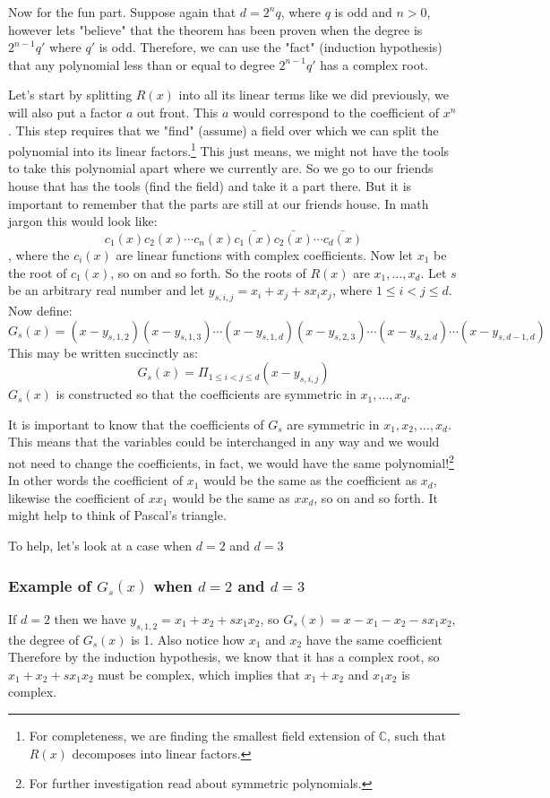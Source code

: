 \documentclass[12pt]{article}
\begin{document}
Now for the fun part.  Suppose again that $d=2^n q$, where $q$ is odd and $n>0$, however lets "believe" that the theorem has been proven when the degree is $2^{n-1}q'$ where $q'$ is odd.  Therefore, we can use the "fact" (induction hypothesis) that any polynomial less than or equal to degree $2^{n-1} q'$ has a complex root.

Let's start by splitting $R(x)$ into all its linear terms like we did previously, we will also put a factor $a$ out front.  This $a$ would correspond to the coefficient of $x^n$.  This step requires that we "find" (assume) a field over which we can split the polynomial into its linear factors.\footnote{For completeness, we are finding the smallest field extension of $\mathbb{C}$, such that $R(x)$ decomposes into linear factors.}  This just means, we might not have the tools to take this polynomial apart where we currently are.  So we go to our friends house that has the tools (find the field) and take it a part there.  But it is important to remember that the parts are still at our friends house.  In math jargon this would look like: \\
$$c_1(x)c_2(x)\cdots c_n(x)\bar{c_1(x)}\bar{c_2(x)}\cdots \bar{c_d(x)}$$, where the $c_i(x)$ are linear functions with complex coefficients.  Now let $x_1$ be the root of $c_1(x)$, so on and so forth.  So the roots of $R(x)$ are $x_1, \ldots, x_d$.  Let $s$ be an arbitrary real number and let $y_{s,i,j} = x_i +x_j + s x_i x_j$, where $1 \leq i < j \leq d$. Now define:
$$ G_s(x) =(x-y_{s,1,2})(x-y_{s,1,3})\cdots(x-y_{s,1,d})(x-y_{s,2,3})\cdots (x-y_{s,2,d})\cdots (x-y_{s,d-1,d})$$
This may be written succinctly as:
$$ G_s(x) = \Pi_{1 \leq i < j \leq d} (x-y_{s,i,j})$$
$G_s(x)$ is constructed so that the coefficients are symmetric in $x_1, \ldots
, x_d$.

It is important to know that the coefficients of $G_s$ are symmetric in $x_1, x_2, \ldots, x_d$.  This means that the variables could be interchanged in any way and we would not need to change the coefficients, in fact, we would have the same polynomial!\footnote{For further investigation read about symmetric polynomials.}  In other words the coefficient of $x_1$ would be the same as the coefficient as $x_d$, likewise the coefficient of $x x_1$ would be the same as $x x_d$, so on and so forth.  It might help to think of Pascal's triangle.

To help, let's look at a case when $d=2$ and $d=3$
\subsubsection*{Example of $G_s(x)$ when $d=2$ and $d=3$}  If $d=2$ then we have $y_{s,1,2} = x_1 +x_2 + s x_1 x_2$, so $G_s(x) = x- x_1 -x_2 - s x_1 x_2$, the degree of $G_s(x)$ is 1.  Also notice how $x_1$ and $x_2$ have the same coefficient  Therefore by the induction hypothesis, we know that it has a complex root, so $x_1 +x_2 + s x_1 x_2$ must be complex, which implies that $x_1+x_2$ and $x_1 x_2$ is complex.\\
\end{document}
